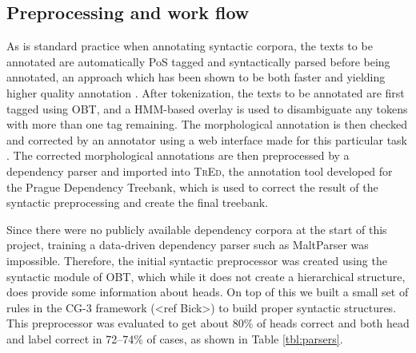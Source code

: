 \documentclass[11pt,a4paper]{article}
\let\app=\textsc
\begin{document}
\subsection{Preprocessing and work flow}
As is standard practice when annotating syntactic corpora, the texts to be
annotated are automatically PoS tagged and syntactically parsed before being
annotated, an approach which has been shown to be both faster and yielding
higher quality annotation \cite{Mar:San:Mar:93,For:Sag:10,Skjaerholt:13}.
After tokenization, the texts to be annotated are first tagged using OBT, and
a HMM-based overlay \cite{Joh:Hag:No:Lyn:2011} is used to disambiguate any
tokens with more than one tag remaining. The morphological annotation is then
checked and corrected by an annotator using a web interface made for this
particular task \cite{Lyn:13}. The corrected morphological annotations are
then preprocessed by a dependency parser and imported into \app{TrEd}, the
annotation tool developed for the Prague Dependency Treebank, which is used to
correct the result of the syntactic preprocessing and create the final
treebank.

Since there were no publicly available dependency corpora at the start of this
project, training a data-driven dependency parser such as MaltParser was
impossible. Therefore, the initial syntactic preprocessor was created using
the syntactic module of OBT, which while it does not create a hierarchical
structure, does provide some information about heads. On top of this we built
a small set of rules in the CG-3 framework (<ref Bick>) to build proper
syntactic structures. This preprocessor was evaluated to get about 80\% of
heads correct and both head and label correct in 72--74\% of cases, as shown
in Table \ref{tbl:parsers}.




%
\end{document}
